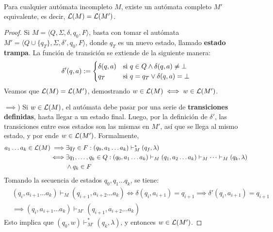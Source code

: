 \begin{theorem*}
    Para cualquier autómata incompleto $M$, existe un autómata completo $M'$ equivalente, es decir, $\mathcal{L}(M) = \mathcal{L}(M')$.
\end{theorem*}
\begin{proof}
    Si $M = \langle Q, \Sigma, \delta, q_0, F \rangle$, basta con tomar el autómata $M' = \langle Q \cup \{q_T\}, \Sigma, \delta', q_0, F \rangle$, donde $q_T$ es un nuevo estado, llamado \textbf{estado trampa}. La función de transición se extiende de la siguiente manera:
    $$
        \delta' (q, a) :=
        \begin{cases}
            \delta(q, a) & \text{si } q \in Q \land \delta(q, a) \neq \mathrm \perp \\
            q_T          & \text{si } q = q_T \lor \delta(q, a) = \mathrm \perp
        \end{cases}
    $$
    Veamos que $\mathcal{L}(M) = \mathcal{L}(M')$, demostrando $w \in \mathcal{L}(M) \iff w \in \mathcal{L}(M')$.

    $\implies$) Si $w \in \mathcal{L}(M)$, el autómata debe pasar por una serie de \textbf{transiciones definidas}, hasta llegar a un estado final. Luego, por la definición de $\delta'$, las transiciones entre esos estados son las mismas en $M'$, así que se llega al mismo estado, y por ende $w \in \mathcal{L}(M')$. Formalmente,
    $$
        \begin{aligned}
            a_1 \dots a_k \in \mathcal{L}(M) \implies & \exists q_f \in F : (q_0, a_1 \dots a_k) \vdash_M^* (q_f, \lambda)                                                         \\
            \iff                             & \exists q_1, \dots, q_k \in Q : (q_0, a_1 \dots a_k) \vdash_M (q_1, a_2 \dots a_k) \vdash_M \cdots \vdash_M (q_k, \lambda) \\
                                             & \land q_k \in F
        \end{aligned}
    $$
    Tomando la secuencia de estados $q_0, q_1 \dots q_k$, se tiene:
    $$
        \begin{aligned}
             & (q_i, a_{i+1} \dots a_k) \vdash_M (q_{i+1}, a_{i+2} \dots a_k) \iff \delta(q_i, a_{i+1}) = q_{i+1} \implies \delta'(q_i, a_{i+1}) = q_{i+1} \\
             & \implies (q_i, a_{i+1} \dots a_k) \vdash_{M'} (q_{i+1}, a_{i+2} \dots a_k)
        \end{aligned}
    $$
    Esto implica que $(q_0, w) \vdash_{M'}^* (q_k, \lambda)$, y entonces $w \in \mathcal{L}(M')$.


\end{proof}
